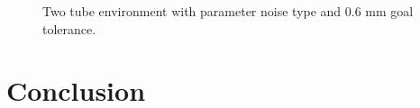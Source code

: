 \begin{figure}
    \caption{Two tube environment with parameter noise type and 0.6 mm goal tolerance.}
    \label{fig:four-tube-traj}
\end{figure}

\section{Conclusion}



%
%



%
%



